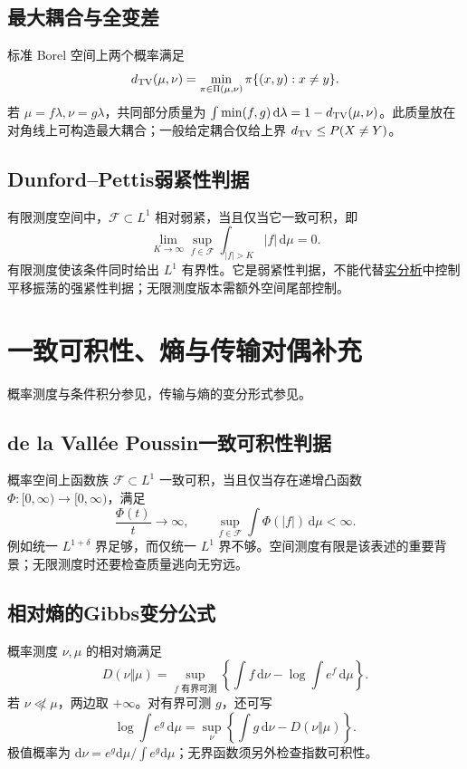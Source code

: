 \documentclass[../main.tex]{subfiles}
\begin{document}
\subsection{最大耦合与全变差}
标准 Borel 空间上两个概率满足
\[
d_{\rm TV}(\mu,\nu)=\min_{\pi\in\Pi(\mu,\nu)}\pi\{(x,y):x\ne y\}.
\]
若 $\mu=f\lambda,\nu=g\lambda$，共同部分质量为 $\int\min(f,g)\,\mathrm d\lambda=1-d_{\rm TV}(\mu,\nu)$。此质量放在对角线上可构造最大耦合；一般给定耦合仅给上界 $d_{\rm TV}\le P(X\ne Y)$。
\subsection{Dunford--Pettis弱紧性判据}
有限测度空间中，$\mathcal F\subset L^1$ 相对弱紧，当且仅当它一致可积，即
\[
\lim_{K\to\infty}\sup_{f\in\mathcal F}\int_{|f|>K}|f|\,\mathrm d\mu=0.
\]
有限测度使该条件同时给出 $L^1$ 有界性。它是弱紧性判据，不能代替\hyperref[sec:ra-compactness]{实分析}中控制平移振荡的强紧性判据；无限测度版本需额外空间尾部控制。

\section{一致可积性、熵与传输对偶补充}
概率测度与条件积分参见\cite{durrett}，传输与熵的变分形式参见\cite{villani}。
\subsection{de la Vallée Poussin一致可积性判据}
概率空间上函数族 $\mathcal F\subset L^1$ 一致可积，当且仅当存在递增凸函数 $\Phi:[0,\infty)\to[0,\infty)$，满足
\[
\frac{\Phi(t)}t\longrightarrow\infty,\qquad
\sup_{f\in\mathcal F}\int\Phi(|f|)\,\mathrm d\mu<\infty.
\]
例如统一 $L^{1+\delta}$ 界足够，而仅统一 $L^1$ 界不够。空间测度有限是该表述的重要背景；无限测度时还要检查质量逃向无穷远。
\subsection{相对熵的Gibbs变分公式}
概率测度 $\nu,\mu$ 的相对熵满足
\[
D(\nu\Vert\mu)=\sup_{f\text{ 有界可测}}
\left\{\int f\,\mathrm d\nu-\log\int e^f\,\mathrm d\mu\right\}.
\]
若 $\nu\not\ll\mu$，两边取 $+\infty$。对有界可测 $g$，还可写
\[
\log\int e^g\,\mathrm d\mu
=\sup_\nu\left\{\int g\,\mathrm d\nu-D(\nu\Vert\mu)\right\}.
\]
极值概率为 $\mathrm d\nu=e^g\mathrm d\mu/\int e^g\mathrm d\mu$；无界函数须另外检查指数可积性。
\end{document}
